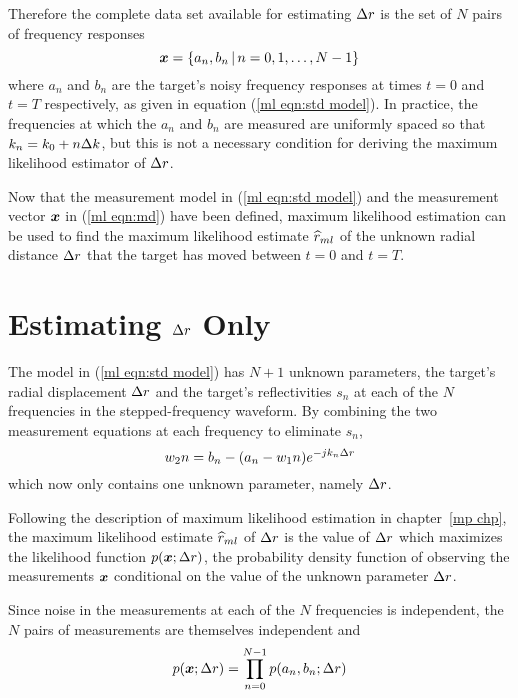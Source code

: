 Therefore the complete data set available for estimating ${\Delta r}$ is the 
set of $N$ pairs of frequency responses
\begin{equation}\label{ml eqn:md} 
\bm{x}=\left\{a_n,b_n \,|\, n=0,1,\ldots,N-1\right\}
\end{equation}
where $a_n$ and $b_n$ are the target's noisy frequency responses at times 
$t=0$ and $t=T$ respectively, as given in equation (\ref{ml eqn:std
model}).  In practice, the frequencies at which the $a_n$ and $b_n$ are
measured are uniformly spaced so that $k_n=k_0+n{\Delta k}$, but this is not a
necessary condition for deriving the maximum likelihood estimator of ${\Delta r}$.


Now that the measurement model in (\ref{ml eqn:std model}) and the
measurement vector $\bm{x}$ in (\ref{ml eqn:md}) have been defined, maximum likelihood estimation
can be used to find the maximum likelihood estimate $\widehat{r}_{ml}$ of the unknown
radial distance ${\Delta r}$ that the target has moved between $t=0$ and $t=T$.

\section{Estimating ${\Delta r}$ Only}

The model in (\ref{ml eqn:std model}) has $N+1$ unknown parameters, the 
target's radial displacement ${\Delta r}$ and the target's reflectivities $s_n$ at
each of the $N$ frequencies in the stepped-frequency waveform.  By combining
the two measurement equations at each frequency to eliminate $s_n$, 
\begin{equation}\label{ml eqn:comb model}
{w_2}{n}=b_n-(a_n-{w_1}{n}){e^{-jk_n{\Delta r}}}
\end{equation}
which now only contains one unknown parameter, namely ${\Delta r}$.

Following the description of maximum likelihood estimation in
chapter~\ref{mp chp}, the maximum likelihood estimate $\widehat{r}_{ml}$ of 
${\Delta r}$ is the value of ${\Delta r}$ which maximizes the likelihood function
$p(\bm{x};{\Delta r})$, the probability density function of observing the
measurements $\bm{x}$ conditional on the value of the unknown parameter ${\Delta r}$.

Since noise in the measurements at each of the $N$ frequencies is
independent, the $N$ pairs of measurements are themselves independent and
\begin{equation}\label{ml eqn:p(md;dr)}
p(\bm{x};{\Delta r})=\prod_{n=0}^{N-1} p(a_n,b_n;{\Delta r})
\end{equation}

